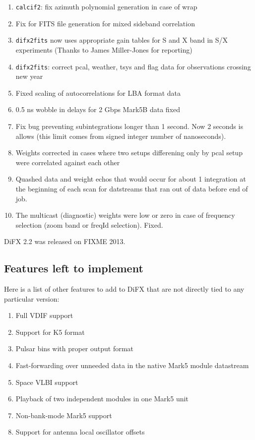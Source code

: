 \begin{enumerate}


\item {\tt calcif2}: fix azimuth polynomial generation in case of wrap
\item Fix for FITS file generation for mixed sideband correlation
\item {\tt difx2fits} now uses appropriate gain tables for S and X band in S/X experiments (Thanks to James Miller-Jones for reporting)
\item {\tt difx2fits}: correct pcal, weather, tsys and flag data for observations crossing new year
\item Fixed scaling of autocorrelations for LBA format data
\item 0.5 ns wobble in delays for 2 Gbps Mark5B data fixed
\item Fix bug preventing subintegrations longer than 1 second. Now 2 seconds is allows (this limit comes from signed integer number of nanoseconds).
\item Weights corrected in cases where two setups differening only by pcal setup were correlated against each other
\item Quashed data and weight echos that would occur for about 1 integration at the beginning of each scan for datstreams that ran out of data before end of job.
\item The multicast (diagnostic) weights were low or zero in case of frequency selection (zoom band or freqId selection). Fixed.


\end{enumerate}


DiFX 2.2 was released on FIXME 2013.


\subsection{Features left to implement}

Here is a list of other features to add to DiFX that are not directly tied to any particular version:
\begin{enumerate}
\item Full VDIF support
\item Support for K5 format
\item Pulsar bins with proper output format
\item Fast-forwarding over unneeded data in the native Mark5 module datastream
\item Space VLBI support
\item Playback of two independent modules in one Mark5 unit
\item Non-bank-mode Mark5 support
\item Support for antenna local oscillator offsets
\end{enumerate}

